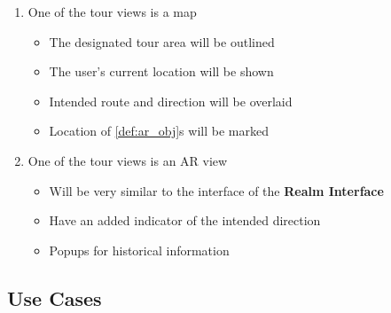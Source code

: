 \documentclass{article}
\begin{document}
\begin{enumerate}[align=left, label=\textbf{TR-FR\arabic*:}]
\begin{enumerate}[align=left, label=\textbf{TR-FR4.\arabic*:}]
        \item One of the tour views is a map
        \begin{itemize}
            \item The designated tour area will be outlined
            \item The user’s current location will be shown
            \item Intended route and direction will be overlaid
            \item Location of \ref{def:ar_obj}s will be marked
        \end{itemize}
        \item One of the tour views is an AR view
        \begin{itemize}
            \item Will be very similar to the interface of the \textbf{Realm Interface}
            \item Have an added indicator of the intended direction
            \item Popups for historical information
        \end{itemize}
    \end{enumerate}
\end{enumerate}

\subsection{Use Cases}
\label{sub:use_cases}
\end{document}
